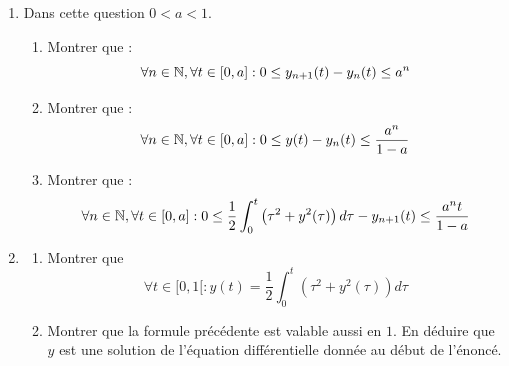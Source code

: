 \begin{enumerate}
\item Dans cette question $0<a<1$.
\begin{enumerate}
 \item Montrer que :
\begin{displaymath}
 \forall n \in \mathbb{N}, \forall t \in [0,a] : 0\leq y_{n+1}(t) - y_n(t) \leq a^n
\end{displaymath}
\item Montrer que :
\begin{displaymath}
 \forall n \in \mathbb{N}, \forall t \in [0,a] : 0\leq y(t) - y_n(t) \leq \frac{a^n}{1-a}
\end{displaymath}
\item Montrer que :
\begin{displaymath}
 \forall n \in \mathbb{N}, \forall t \in [0,a] :
 0\leq \frac{1}{2}\int_0^t\left(\tau^2+y^2(\tau) \right)d\tau  - y_{n+1}(t) \leq \frac{a^nt}{1-a}
\end{displaymath}
\end{enumerate}
\item \begin{enumerate}
 \item Montrer que 
\begin{displaymath}
 \forall t\in [0,1[ : y(t) = \frac{1}{2}\int_0^t\left(\tau^2+y^2(\tau) \right)d\tau
\end{displaymath}
\item Montrer que la formule précédente est valable aussi en $1$. En déduire que $y$ est une solution de l'équation différentielle donnée au début de l'énoncé.
\end{enumerate}
\end{enumerate}

